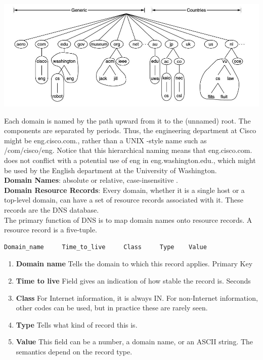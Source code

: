 \documentclass[a4paper,oneside]{book}
\begin{document}
\begin{minipage}{0.5\textwidth}
\centering
{}
\includegraphics[width=\textwidth,height=0.7\textwidth]{Images/dnszones}
\label{fig:dnszones}
\end{minipage}
Each domain is named by the path upward from it to the (unnamed) root. The components are separated by periods. Thus, the engineering department at Cisco might be eng.cisco.com., rather than a UNIX -style name such as /com/cisco/eng. Notice that this hierarchical naming means that eng.cisco.com. does not conflict with a potential use of eng in eng.washington.edu., which might be used by the English department at the University of Washington.\\
\textbf{Domain Names}: absolute or relative, case-insensitive . \\
\textbf{Domain Resource Records}: Every domain, whether it is a single host or a top-level domain, can have a set of resource records associated with it. These records are the DNS database.\\
The primary function of DNS is to map domain names onto resource
records. A resource record is a five-tuple.
\begin{verbatim}
Domain_name     Time_to_live     Class     Type    Value
\end{verbatim}
\begin{enumerate}
\item \textbf{Domain name}  Tells the domain to which this record applies. Primary Key
\item \textbf{Time to live} Field gives an indication of how stable the record is. Seconds
\item \textbf{Class}  For Internet information, it is always IN. For non-Internet information, other codes can be used, but in practice these are rarely seen.
\item \textbf{Type}  Tells what kind of record this is.
\item \textbf{Value} This field can be a number, a domain name,
or an ASCII string. The semantics depend on the record type. 
\end{enumerate}
\end{document}
